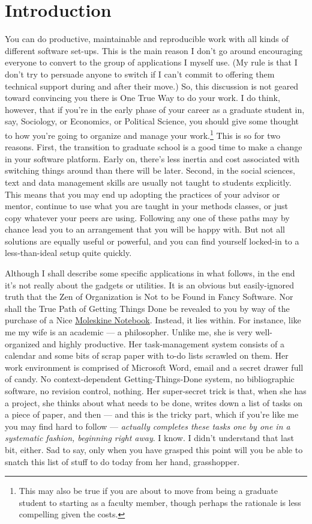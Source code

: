 \documentclass[11pt,article,oneside]{memoir}
\begin{document}
\chapter{Introduction} %
\label{sec:introduction}
You can do productive, maintainable and reproducible work with all kinds of different software set-ups. This is the main reason I don't go around encouraging everyone to convert to the group of applications I myself use. (My rule is that I don't try to persuade anyone to switch if I can't commit to offering them technical support during and after their move.) So, this discussion is not geared toward convincing you there is One True Way to do your work. I do think, however, that if you're in the early phase of your career as a graduate student in, say, Sociology, or Economics, or Political Science, you should give some thought to how you're going to organize and manage your work.\footnote{This may also be true if you are about to move from being a graduate student to starting as a faculty member, though perhaps the rationale is less compelling given the costs.} This is so for two reasons. First, the transition to graduate school is a good time to make a change in your software platform. Early on, there's less inertia and cost associated with switching things around than there will be later. Second, in the social sciences, text and data management skills are usually not taught to students explicitly. This means that you may end up adopting the practices of your advisor or mentor, continue to use what you are taught in your methods classes, or just copy whatever your peers are using. Following any one of these paths may by chance lead you to an arrangement that you will be happy with. But not all solutions are equally useful or powerful, and you can find yourself locked-in to a less-than-ideal setup quite quickly.

Although I shall describe some specific applications in what follows, in the end it's not really about the gadgets or utilities. It is an obvious but easily-ignored truth that the Zen of Organization is Not to be Found in Fancy Software. Nor shall the True Path of Getting Things Done be revealed to you by way of the purchase of a Nice \href{http://www.moleskineus.com/}{Moleskine Notebook}. Instead, it lies within. For instance, like me my wife is an academic --- a philosopher. Unlike me, she is very well-organized and highly productive. Her task-management system consists of a calendar and some bits of scrap paper with to-do lists scrawled on them. Her work environment is comprised of Microsoft Word, email and a secret drawer full of candy. No context-dependent Getting-Things-Done system, no bibliographic software, no revision control, nothing. Her super-secret trick is that, when she has a project, she thinks about what needs to be done, writes down a list of tasks on a piece of paper, and then --- and this is the tricky part, which if you're like me you may find hard to follow --- \emph{actually completes these tasks one by one in a systematic fashion, beginning right away}. I know. I didn't understand that last bit, either. Sad to say, only when you have grasped this point will you be able to snatch this list of stuff to do today from her hand, grasshopper. 
\end{document}
